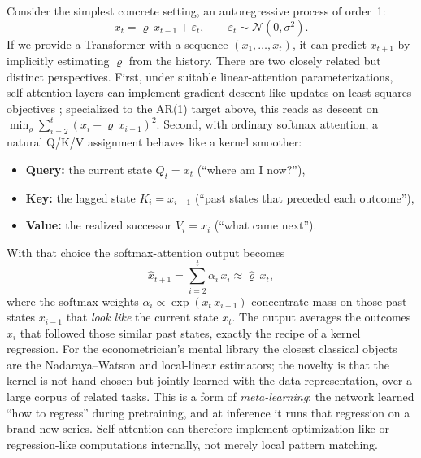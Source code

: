 \documentclass[11pt,a4paper]{report}
\begin{document}
Consider the simplest concrete setting, an autoregressive process of order~1:
\begin{equation}
x_t = \varrho \, x_{t-1} + \varepsilon_t, \qquad \varepsilon_t \sim \mathcal{N}(0, \sigma^2).
\end{equation}
If we provide a Transformer with a sequence $(x_1, \dots, x_t)$, it can predict $x_{t+1}$ by implicitly estimating $\varrho$ from the history.  There are two closely related but distinct perspectives.  First, under suitable linear-attention parameterizations, self-attention layers can implement gradient-descent-like updates on least-squares objectives \citep{vonoswald2023transformers}; specialized to the AR(1) target above, this reads as descent on $\min_\varrho \sum_{i=2}^{t} (x_i - \varrho\,x_{i-1})^2$.  Second, with ordinary softmax attention, a natural Q/K/V assignment behaves like a kernel smoother:
\begin{itemize}[itemsep=2pt]
\item \textbf{Query:} the current state $Q_t = x_t$ (``where am I now?''),
\item \textbf{Key:} the lagged state $K_i = x_{i-1}$ (``past states that preceded each outcome''),
\item \textbf{Value:} the realized successor $V_i = x_i$ (``what came next'').
\end{itemize}
With that choice the softmax-attention output becomes
\begin{equation}
\hat{x}_{t+1} = \sum_{i=2}^{t} \alpha_i\, x_i \approx \hat{\varrho} \, x_t,
\end{equation}
where the softmax weights $\alpha_i \propto \exp(x_t\,x_{i-1})$ concentrate mass on those past states $x_{i-1}$ that \emph{look like} the current state $x_t$.  The output averages the outcomes $x_i$ that followed those similar past states, exactly the recipe of a kernel regression.  For the econometrician's mental library the closest classical objects are the Nadaraya--Watson and local-linear estimators; the novelty is that the kernel is not hand-chosen but jointly learned with the data representation, over a large corpus of related tasks.  This is a form of \emph{meta-learning}: the network learned ``how to regress'' during pretraining, and at inference it runs that regression on a brand-new series.  Self-attention can therefore implement optimization-like or regression-like computations internally, not merely local pattern matching.
\end{document}
